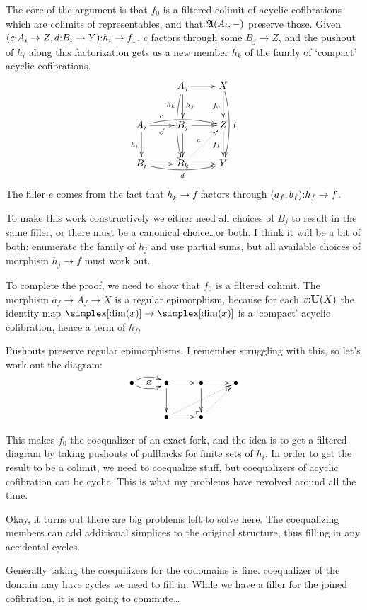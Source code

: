 \documentclass[csh.tex]{subfiles}
\makeatletter
\newcommand\pushout{\ar@{}[dr]|(.9)\ulcorner}
\makeatother
\begin{document}
The core of the argument is that $f_0$ is a filtered colimit of acyclic cofibrations which are colimits of representables, and that $\mathfrak A(A_i,-)$ preserve those. Given $(c\mathord : A_i\to Z,d\mathord : B_i\to Y)\mathord : h_i\to f_1$, $c$ factors through some $B_j\to Z$, and the pushout of $h_i$ along this factorization gets us a new member $h_k$ of the family of `compact' acyclic cofibrations.
\[ \xymatrix{
 & A_j\ar@/_/[dd]_(.25){h_k}\ar[d]^{h_j} \ar[r] & X\ar[d]_{f_0} \ar@/^/[dd]^f\\
A_i \ar[d]_{h_i} \ar[r]_{c'} \ar@/^/[rr]^(.25)c \pushout & B_j \ar[r]\ar[d] &Z\ar[d]_{f_1}\\
B_i \ar[r]\ar@/_/[rr]_{d} & B_k\ar[r]\ar@{.>}[ur]^e & Y
}\]
The filler $e$ comes from the fact that $h_k\to f$ factors through $(a_f,b_f)\mathord : h_f\to f$.

To make this work constructively we either need all choices of $B_j$ to result in the same filler, or there must be a canonical choice\dots or both. I think it will be a bit of both: enumerate the family of $h_j$ and use partial sums, but all available choices of morphism $h_j\to f$ must work out.

To complete the proof, we need to show that $f_0$ is a filtered colimit. The morphism $a_f\to A_f\to X$ is a regular epimorphism, because for each $x\mathord :\mathbf{U}(X)$ the identity map $\simplex[\dim(x)]\to\simplex[\dim(x)]$ is a `compact' acyclic cofibration, hence a term of $h_f$.

Pushouts preserve regular epimorphisms. I remember struggling with this, so let's work out the diagram:
\[\xymatrix{
\bullet \ar@/^/[r]\ar@/_/[r]\ar@{}[r]|\varnothing & \bullet \ar[r]\ar[d]\pushout & \bullet \ar[r]\ar[d] & \bullet \\
& \bullet \ar[r]\ar@{.>}[urr] & \bullet \ar@{.>}[ur]
}\]

This makes $f_0$ the coequalizer of an exact fork, and the idea is to get a filtered diagram by taking pushouts of pullbacks for finite sets of $h_i$. In order to get the result to be a colimit, we need to coequalize stuff, but coequalizers of acyclic cofibration can be cyclic. This is what my problems have revolved around all the time.

Okay, it turns out there are big problems left to solve here.
The coequalizing members can add additional simplices to the original structure, thus filling in any accidental cycles.

Generally taking the coequilizers for the codomains is fine. coequalizer of the domain may have cycles we need to fill in. While we have a filler for the joined cofibration, it is not going to commute\dots
\end{document}
